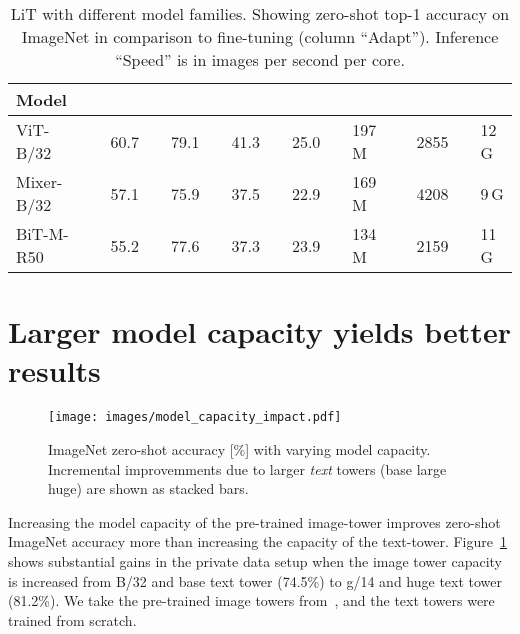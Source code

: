 \documentclass[10pt,twocolumn,letterpaper]{article}
\def \lit {LiT\xspace}
\begin{document}
\begin{table}[h]
  \setlength{\tabcolsep}{0pt}
  \setlength{\extrarowheight}{5pt}
  \renewcommand{\arraystretch}{0.75}
  \centering
\begin{tabularx}{\linewidth}{p{1.7cm}p{0.1cm}Cp{0.1cm}Cp{0.1cm}Cp{0.1cm}Cp{0.1cm}Cp{0.2cm}Cp{0.1cm}C}
    \toprule[1pt]
     \bf{Model} &&
    {\centering {}} &&
    {\centering {}} &&
    {\centering {}} &&
    {\centering {}} &&
    {\centering {}} &&
    {\centering {}} &&
    {\centering {}} \\
    \midrule
   ViT-B/32 &&  60.7 &&  79.1 &&  41.3 &&  25.0 && 197\,M &&  2855 && 12\,G \\
 Mixer-B/32 &&  57.1 &&  75.9 &&  37.5 &&  22.9 && 169\,M &&  4208 && \phantom{0}9\,G \\
   BiT-M-R50 &&  55.2 &&  77.6 &&  37.3 &&  23.9 && 134\,M &&  2159 && 11\,G \\
    \bottomrule[1pt]
  \end{tabularx}
  \caption{\protect\lit with different model families. Showing zero-shot top-1 accuracy on ImageNet in comparison to fine-tuning (column “Adapt”). Inference “Speed” is in images per second per core.}\label{table:more_image_architectures}
\end{table}



\section{Larger model capacity yields better results}
\label{sec:model_capacity_impact}

\begin{figure}[b]
    \centering
    \texttt{[image: images/model\_capacity\_impact.pdf]}
    \caption{ImageNet zero-shot accuracy [\%] with varying model capacity. Incremental improvemments due to larger \textit{text} towers (base  large  huge) are shown as stacked bars.}
    \label{fig:model_capacity_impact}
\end{figure}

Increasing the model capacity of the pre-trained image-tower improves zero-shot ImageNet accuracy more than increasing the capacity of the text-tower.
Figure~\ref{fig:model_capacity_impact} shows substantial gains in the private data setup when the image tower capacity is increased from B/32 and base text tower (74.5\%) to g/14 and huge text tower (81.2\%). We take the pre-trained image towers from~\cite{vitg}, and the text towers were trained from scratch.
\end{document}
